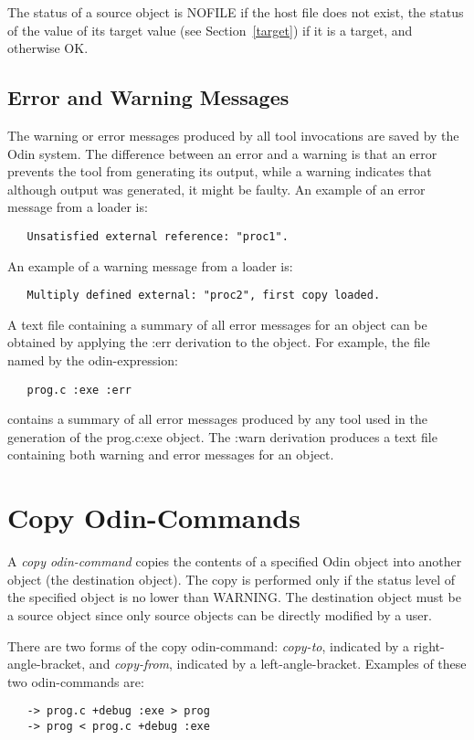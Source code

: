 The status of a source object is {\ex NOFILE}
if the host file does not exist,
the status of the value of its target value (see Section~\ref{target})
if it is a target, and otherwise {\ex OK}.

\subsection{Error and Warning Messages}

The warning or error messages produced by all tool invocations
are saved by the Odin system.
The difference between an error and a warning is that
an error prevents the tool from generating its output,
while a warning indicates that although output was generated,
it might be faulty.
An example of an error message from a loader is:
\begin{verbatim}
   Unsatisfied external reference: "proc1".
\end{verbatim}
An example of a warning message from a loader is:
\begin{verbatim}
   Multiply defined external: "proc2", first copy loaded.
\end{verbatim}

A text file containing a summary of all error messages for an object
can be obtained by applying the {\ex :err} derivation to the object.
For example, the file named by the odin-expression:
\begin{verbatim}
   prog.c :exe :err
\end{verbatim}
contains a summary of all error messages 
produced by any tool used in the generation of the {\ex prog.c:exe} object.
The {\ex :warn} derivation produces a text file containing both
warning and error messages for an object.


\section{Copy Odin-Commands}
\label{copy}

A {\em copy odin-command} copies the contents of a specified Odin object
into another object (the destination object).
The copy is performed only if the status level
of the specified object is no lower than {\ex WARNING}.
The destination object must be a source object
since only source objects can be directly modified by a user.

There are two forms of the copy odin-command:
{\em copy-to}, indicated by a right-angle-bracket, and
{\em copy-from}, indicated by a left-angle-bracket.
Examples of these two odin-commands are:
\begin{verbatim}
   -> prog.c +debug :exe > prog
   -> prog < prog.c +debug :exe
\end{verbatim}

